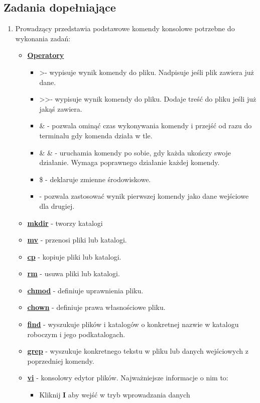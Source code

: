 \documentclass[10pt,a4paper]{article}
\begin{document}
\subsection{Zadania dopełniające}

\begin{enumerate}
\item Prowadzący przedstawia podstawowe komendy konsolowe potrzebne do wykonania zadań:
\begin{itemize}
\item \textbf{\underline{Operatory}}
\begin{itemize}
\item \textgreater - wypisuje wynik komendy do pliku. Nadpisuje jeśli plik zawiera już dane.
\item \textgreater \textgreater - wypisuje wynik komendy do pliku. Dodaje treść do pliku jeśli już jakąś zawiera.
\item \& - pozwala ominąć czas wykonywania komendy i przejść od razu do terminalu gdy komenda działa w tle.
\item \& \& - uruchamia komendy po sobie, gdy każda ukończy swoje działanie. Wymaga poprawnego działanie każdej komendy.
\item \$ - deklaruje zmienne środowiskowe.
\item \textbar - pozwala zastosować wynik pierwszej komendy jako dane wejściowe dla drugiej.
\end{itemize}
\item \textbf{\underline{mkdir}} - tworzy katalogi
\item \textbf{\underline{mv}} - przenosi pliki lub katalogi.
\item \textbf{\underline{cp}} - kopiuje pliki lub katalogi.
\item \textbf{\underline{rm}} - usuwa pliki lub katalogi.
\item \textbf{\underline{chmod}} - definiuje uprawnienia pliku.
\item \textbf{\underline{chown}} - definiuje prawa własnościowe pliku.
\item \textbf{\underline{find}} - wyszukuje plików i katalogów o konkretnej nazwie w katalogu roboczym i jego podkatalogach.
\item \textbf{\underline{grep}} - wyszukuje konkretnego tekstu w pliku lub danych wejściowych z poprzedniej komendy.
\item \textbf{\underline{vi}} - konsolowy edytor plików. Najważniejsze informacje o nim to:
\begin{itemize}
\item Kliknij \textbf{I} aby wejść w tryb wprowadzania danych

\end{itemize}
\end{itemize}
\end{enumerate}
\end{document}
